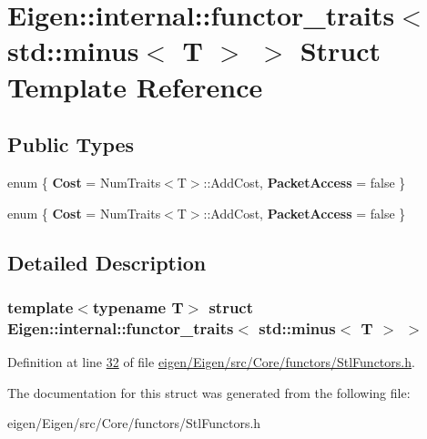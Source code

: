 \hypertarget{struct_eigen_1_1internal_1_1functor__traits_3_01std_1_1minus_3_01_t_01_4_01_4}{}\section{Eigen\+:\+:internal\+:\+:functor\+\_\+traits$<$ std\+:\+:minus$<$ T $>$ $>$ Struct Template Reference}
\label{struct_eigen_1_1internal_1_1functor__traits_3_01std_1_1minus_3_01_t_01_4_01_4}
\subsection*{Public Types}
\begin{DoxyCompactItemize}
\item 
\mbox{\label{struct_eigen_1_1internal_1_1functor__traits_3_01std_1_1minus_3_01_t_01_4_01_4_a75d7cd7114dd525ca92ea6184b2c2503}} 
enum \{ {\bfseries Cost} = Num\+Traits$<$T$>$\+:\+:Add\+Cost, 
{\bfseries Packet\+Access} = false
 \}
\item 
\mbox{\label{struct_eigen_1_1internal_1_1functor__traits_3_01std_1_1minus_3_01_t_01_4_01_4_add29d6cdac3b03d539b23a7587b66423}} 
enum \{ {\bfseries Cost} = Num\+Traits$<$T$>$\+:\+:Add\+Cost, 
{\bfseries Packet\+Access} = false
 \}
\end{DoxyCompactItemize}


\subsection{Detailed Description}
\subsubsection*{template$<$typename T$>$\newline
struct Eigen\+::internal\+::functor\+\_\+traits$<$ std\+::minus$<$ T $>$ $>$}



Definition at line \hyperlink{eigen_2_eigen_2src_2_core_2functors_2_stl_functors_8h_source_l00032}{32} of file \hyperlink{eigen_2_eigen_2src_2_core_2functors_2_stl_functors_8h_source}{eigen/\+Eigen/src/\+Core/functors/\+Stl\+Functors.\+h}.



The documentation for this struct was generated from the following file\+:\begin{DoxyCompactItemize}
\item 
eigen/\+Eigen/src/\+Core/functors/\+Stl\+Functors.\+h\end{DoxyCompactItemize}

